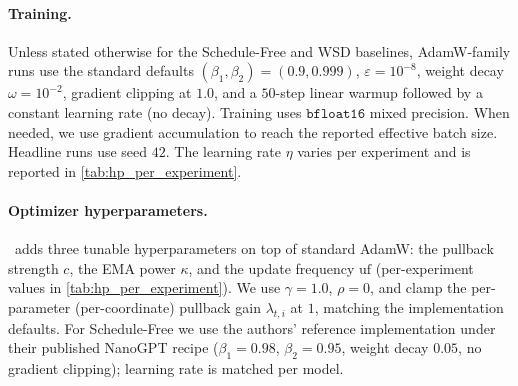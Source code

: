 \paragraph{Training.} Unless stated otherwise for the Schedule-Free and WSD baselines, AdamW-family runs use the standard defaults $(\beta_1, \beta_2) = (0.9, 0.999)$, $\varepsilon = 10^{-8}$, weight decay $\omega = 10^{-2}$, gradient clipping at $1.0$, and a $50$-step linear warmup followed by a constant learning rate (no decay). Training uses $\texttt{bfloat16}$ mixed precision. When needed, we use gradient accumulation to reach the reported effective batch size. Headline runs use seed $42$. The learning rate $\eta$ varies per experiment and is reported in \cref{tab:hp_per_experiment}.

\paragraph{Optimizer hyperparameters.} \pace\ adds three tunable hyperparameters on top of standard AdamW: the pullback strength $c$, the EMA power $\kappa$, and the update frequency $\mathrm{uf}$ (per-experiment values in \cref{tab:hp_per_experiment}). We use $\gamma=1.0$, $\rho=0$, and clamp the per-parameter (per-coordinate) pullback gain $\lambda_{t,i}$ at $1$, matching the implementation defaults. For Schedule-Free \citep{defazio2024schedule} we use the authors' reference implementation under their published NanoGPT recipe ($\beta_1{=}0.98$, $\beta_2{=}0.95$, weight decay $0.05$, no gradient clipping); learning rate is matched per model.

